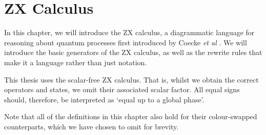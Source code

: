 \chapter{ZX Calculus}%
\label{zx-calculus}

In this chapter, we will introduce the ZX calculus, a diagrammatic language for reasoning about quantum processes first introduced by Coecke \textit{et al} \cite{Coecke2011}. We will introduce the basic generators of the ZX calculus, as well as the rewrite rules that make it a language rather than just notation. 

This thesis uses the scalar-free ZX calculus. That is, whilst we obtain the correct operators and states, we omit their associated scalar factor. All equal signs should, therefore, be interpreted as `equal up to a global phase'.

Note that all of the definitions in this chapter also hold for their colour-swapped counterparts, which we have chosen to omit for brevity.

